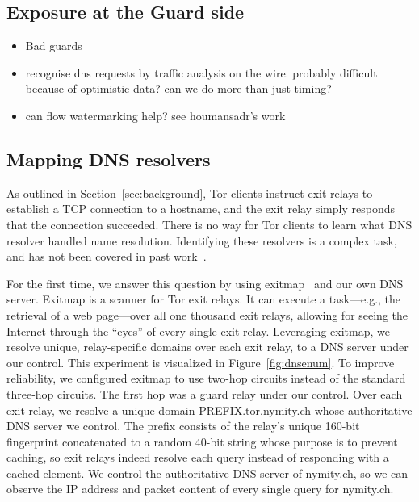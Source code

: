 \subsection{Exposure at the Guard side}
\begin{itemize}
	\item Bad guards
	\item recognise dns requests by traffic analysis on the wire.  probably
		difficult because of optimistic data?  can we do more than just timing?
	\item can flow watermarking help?  see houmansadr's
		work~\cite{Houmansadr2011a}
\end{itemize}

\subsection{Mapping DNS resolvers}
As outlined in Section~\ref{sec:background}, Tor clients instruct exit relays to
establish a TCP connection to a hostname, and the exit relay simply responds
that the connection succeeded.  There is no way for Tor clients to learn what
DNS resolver handled name resolution.  Identifying these resolvers is a complex
task, and has not been covered in past work~\cite{Johnson2013a}.

For the first time, we answer this question by using exitmap~\cite{exitmap} and
our own DNS server.  Exitmap is a scanner for Tor exit relays.  It can execute
a task---e.g., the retrieval of a web page---over all one thousand exit relays,
allowing for seeing the Internet through the ``eyes'' of every single exit
relay.  Leveraging exitmap, we resolve unique, relay-specific domains over each
exit relay, to a DNS server under our control.  This experiment is visualized
in Figure~\ref{fig:dnsenum}.  To improve reliability, we configured exitmap to
use two-hop circuits instead of the standard three-hop circuits.  The first hop
was a guard relay under our control.  Over each exit relay, we resolve a unique
domain PREFIX.tor.nymity.ch whose authoritative DNS server we control.  The
prefix consists of the relay's unique 160-bit fingerprint concatenated to a
random 40-bit string whose purpose is to prevent caching, so exit relays indeed
resolve each query instead of responding with a cached element.  We control the
authoritative DNS server of nymity.ch, so we can observe the IP address and
packet content of every single query for nymity.ch.

